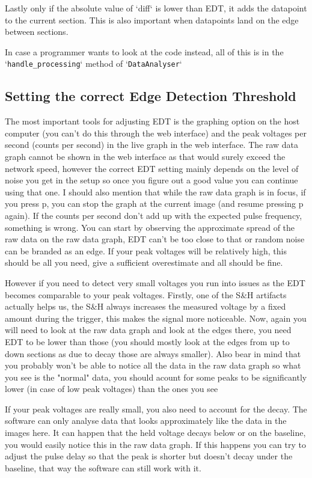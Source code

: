 \documentclass[a4paper, 10pt]{article}
\begin{document}
Lastly only if the absolute value of `diff` is lower than EDT, it adds the datapoint to the current section.
This is also important when datapoints land on the edge between sections.

In case a programmer wants to look at the code instead, all of this is in the `\lstinline{handle_processing}` method of `\lstinline{DataAnalyser}`

\subsection{Setting the correct Edge Detection Threshold}
The most important tools for adjusting EDT is the graphing option on the host computer (you can't do this through the web interface) and the peak voltages per second (counts per second) in the live graph in the web interface.
The raw data graph cannot be shown in the web interface as that would surely exceed the network speed, however the correct EDT setting mainly depends on the level of noise you get in the setup so once you figure out a good value you can continue using that one.
I should also mention that while the raw data graph is in focus, if you press p, you can stop the graph at the current image (and resume pressing p again).
If the counts per second don't add up with the expected pulse frequency, something is wrong.
You can start by observing the approximate spread of the raw data on the raw data graph, EDT can't be too close to that or random noise can be branded as an edge.
If your peak voltages will be relatively high, this should be all you need, give a sufficient overestimate and all should be fine.

However if you need to detect very small voltages you run into issues as the EDT becomes comparable to your peak voltages.
Firstly, one of the S\&H artifacts actually helps us, the S\&H always increases the measured voltage by a fixed amount during the trigger, this makes the signal more noticeable.
Now, again you will need to look at the raw data graph and look at the edges there, you need EDT to be lower than those (you should mostly look at the edges from up to down sections as due to decay those are always smaller).
Also bear in mind that you probably won't be able to notice all the data in the raw data graph so what you see is the "normal" data, you should acount for some peaks to be significantly lower (in case of low peak voltages) than the ones you see

If your peak voltages are really small, you also need to account for the decay.
The software can only analyse data that looks approximately like the data in the images here.
It can happen that the held voltage decays below or on the baseline, you would easily notice this in the raw data graph.
If this happens you can try to adjust the pulse delay so that the peak is shorter but doesn't decay under the baseline, that way the software can still work with it.
\end{document}
